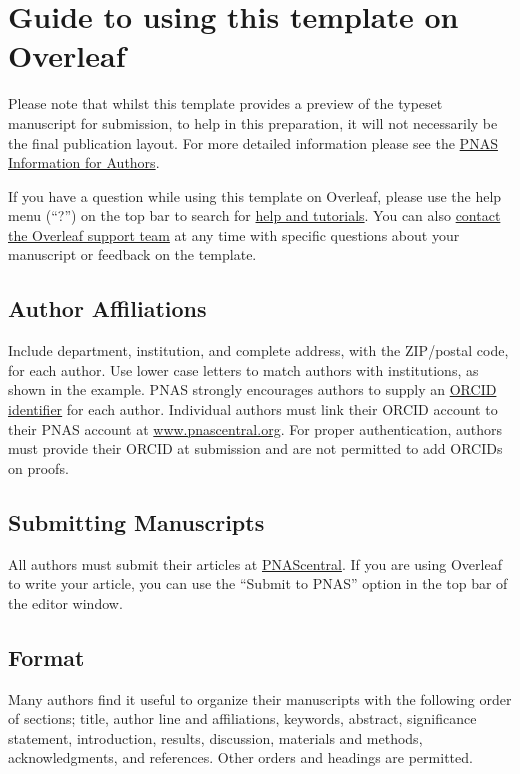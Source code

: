 \documentclass[9pt,twocolumn,twoside,lineno]{pnas-new}
\begin{document}
\section*{Guide to using this template on Overleaf}

Please note that whilst this template provides a preview of the typeset manuscript for submission, to help in this preparation, it will not necessarily be the final publication layout. For more detailed information please see the \href{https://www.pnas.org/page/authors/format}{PNAS Information for Authors}.

If you have a question while using this template on Overleaf, please use the help menu (``?'') on the top bar to search for \href{https://www.overleaf.com/help}{help and tutorials}. You can also \href{https://www.overleaf.com/contact}{contact the Overleaf support team} at any time with specific questions about your manuscript or feedback on the template.

\subsection*{Author Affiliations}

Include department, institution, and complete address, with the ZIP/postal code, for each author. Use lower case letters to match authors with institutions, as shown in the example. PNAS strongly encourages authors to supply an \href{https://orcid.org/}{ORCID identifier} for each author. Individual authors must link their ORCID account to their PNAS account at \href{http://www.pnascentral.org/}{www.pnascentral.org}. For proper authentication, authors must provide their ORCID at submission and are not permitted to add ORCIDs on proofs.

\subsection*{Submitting Manuscripts}

All authors must submit their articles at \href{http://www.pnascentral.org/cgi-bin/main.plex}{PNAScentral}. If you are using Overleaf to write your article, you can use the ``Submit to PNAS'' option in the top bar of the editor window. 

\subsection*{Format}

Many authors find it useful to organize their manuscripts with the following order of sections;  title, author line and affiliations, keywords, abstract, significance statement, introduction, results, discussion, materials and methods, acknowledgments, and references. Other orders and headings are permitted.
\end{document}
